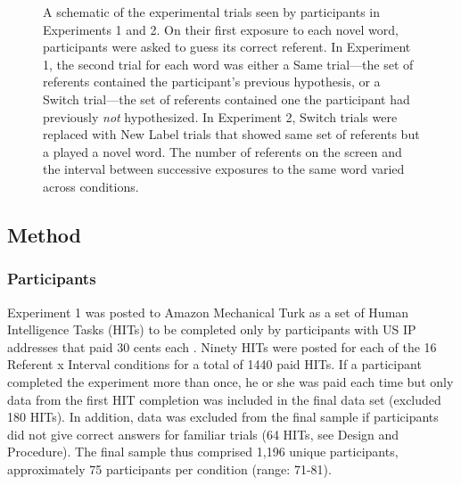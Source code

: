 \documentclass[man,floatsintext]{apa6}
\begin{document}
\begin{figure}[tb]
	\caption{\label{fig:design} A schematic of the experimental trials seen by participants in Experiments 1 and 2. On their first exposure to each novel word, participants were asked to guess its correct referent. In Experiment 1, the second trial for each word was either a Same trial---the set of referents contained the participant's previous hypothesis, or a Switch trial---the set of referents contained one the participant had previously \emph{not} hypothesized. In Experiment 2, Switch trials were replaced with New Label trials that showed same set of referents but a played a novel word. The number of referents on the screen and the interval between successive exposures to the same word varied across conditions.}
\end{figure}

\subsection{Method}

\subsubsection{Participants}

Experiment 1 was posted to Amazon Mechanical Turk as a set of Human Intelligence Tasks (HITs) to be completed only by participants with US IP addresses that paid 30 cents each \cite<for a detailed comparison of laboratory and Mechanical Turk studies see>{Crump2013}. Ninety HITs were posted for each of the 16 Referent x Interval conditions for a total of 1440 paid HITs. If a participant completed the experiment more than once, he or she was paid each time but only data from the first HIT completion was included in the final data set (excluded 180 HITs). In addition, data was excluded from the final sample if participants did not give correct answers for familiar trials (64 HITs, see Design and Procedure). The final sample thus comprised 1,196 unique participants, approximately 75 participants per condition (range: 71-81).
\end{document}
